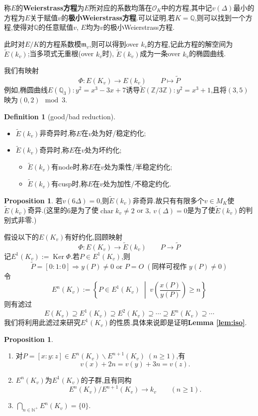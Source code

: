 \documentclass[12pt,A4paper,oneside,reqno]{amsart}
\numberwithin{equation}{section}
\theoremstyle{definition}
\newtheorem{proposition}[theorem]{Proposition}
\newtheorem{defn}[theorem]{Definition}
\theoremstyle{plain}
\theoremstyle{plain}
\numberwithin{equation}{section}
\theoremstyle{remark}
\DeclareMathOperator{\cha}{\operatorname{char}}
\DeclareMathOperator{\Ker}{\operatorname{Ker}}
\begin{document}
	称$E$的\textbf{Weierstrass方程}为$E$所对应的系数均落在$\mathcal{O}_{K}$中的方程,其中记$v(\Delta)$最小的方程为$E$关于赋值$v$的\textbf{极小Weierstrass方程}.可以证明,若$K=\mathbb{Q}$,则可以找到一个方程,使得对$\mathbb{Q}$的任意赋值$v$, $E$均为$v$的极小Weierstrass方程.
	
	此时对$E/K$的方程系数模$\mathfrak{m}_v$,则可以得到over $k_v$的方程,记此方程的解空间为$\tilde{E}(k_v)$;当多项式无重根(over $k_v$时), $\tilde{E}(k_v)$成为一条over $k_v$的椭圆曲线.
	
	我们有映射
	$$\Phi:E(K_v) \longrightarrow E(k_v) \qquad P \longmapsto \tilde{P}$$
	例如,椭圆曲线$E(\mathbb{Q}_3): y^2=x^3-3x+7$诱导$\tilde{E}(\mathbb{Z}/3\mathbb{Z}):y^2=x^3+1$,且将$(3,5)$映为$(0,2) \mod 3$.

\begin{defn}[good/bad reduction]\
	\begin{itemize}
		\item $\tilde{E}(k_v)$非奇异时,称$E$在$v$处为好/稳定约化;
		\item 	$\tilde{E}(k_v)$奇异时,称$E$在$v$处为坏约化;
		\begin{itemize}
			\item $\tilde{E}(k_v)$有node时,称$E$在$v$处为乘性/半稳定约化;
			\item $\tilde{E}(k_v)$有cusp时,称$E$在$v$处为加性/不稳定约化.
		\end{itemize}
	\end{itemize}
\end{defn}
\begin{proposition}
	若$v(6\Delta)=0$,则$\tilde{E}(k_v)$非奇异.故只有有限多个$v\in M_K$使$\tilde{E}(k_v)$奇异.(这里的$6$是为了使$\cha k_v \neq 2$ or $3$, $v(\Delta)=0$是为了使$\tilde{E}(k_v)$的判别式非零.)
\end{proposition}
假设以下的$E(K_v)$有好约化,回顾映射
$$\Phi:E(K_v) \longrightarrow \tilde{E}(k_v) \qquad P \longrightarrow \tilde{P}$$
记$E^1(K_v):=\Ker \Phi$.若$P \in E^1(K_v)$,则
$$\tilde{P} =[0:1:0] \Longrightarrow y(P) \neq 0 \text{ or } P=O \;(\text{同样可视作 }y(P) \neq 0)$$
令
$$E^n(K_v):= \left\{ P \in E^1(K_v) \;\middle|\; v\left(\frac{x(P)}{y(P)}\right) \geqslant n \right\}$$
则有滤过
$$E(K_v) \supseteq E^1(K_v)\supseteq E^2(K_v)\supseteq \cdots \supseteq E^n(K_v)\supseteq \cdots$$
我们将利用此滤过来研究$E^1(K_v)$的性质.具体来说即是证明\textbf{Lemma \ref{lem:iso}}.
\begin{proposition}\label{prop:E^n(K_v)}\
	\begin{enumerate}[1.]
	\item 对$P=[x:y:z] \in E^n(K_v) \smallsetminus E^{n+1}(K_v)\;(n \geqslant 1)$,有
	$$v(x)+2n=v(y)+3n =v(z).$$
	\item $E^n(K_v)$为$E^1(K_v)$的子群,且有同构
	\begin{equation}\label{eq:fitereditem}
	E^{n}(K_v) / E^{n+1}(K_v) \longrightarrow k_v \qquad (n \geqslant 1).
	\end{equation}
	\item \label{item:complete}$\bigcap_{n \in \mathbb{N}^+}E^n(K_v)=\{0\}$.
	\end{enumerate}
\end{proposition}
\end{document}
